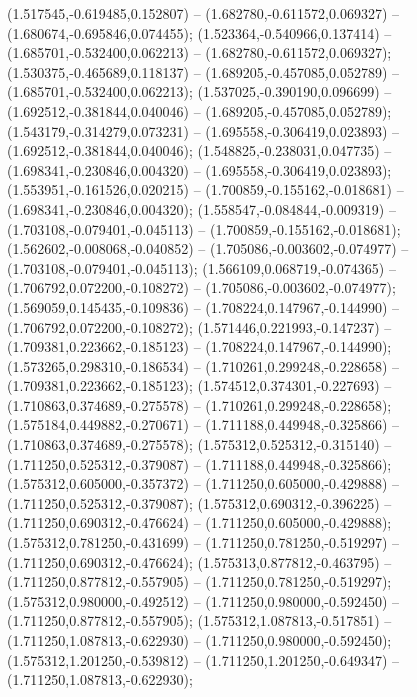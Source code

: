  (1.517545,-0.619485,0.152807) -- (1.682780,-0.611572,0.069327) -- (1.680674,-0.695846,0.074455);
 (1.523364,-0.540966,0.137414) -- (1.685701,-0.532400,0.062213) -- (1.682780,-0.611572,0.069327);
 (1.530375,-0.465689,0.118137) -- (1.689205,-0.457085,0.052789) -- (1.685701,-0.532400,0.062213);
 (1.537025,-0.390190,0.096699) -- (1.692512,-0.381844,0.040046) -- (1.689205,-0.457085,0.052789);
 (1.543179,-0.314279,0.073231) -- (1.695558,-0.306419,0.023893) -- (1.692512,-0.381844,0.040046);
 (1.548825,-0.238031,0.047735) -- (1.698341,-0.230846,0.004320) -- (1.695558,-0.306419,0.023893);
 (1.553951,-0.161526,0.020215) -- (1.700859,-0.155162,-0.018681) -- (1.698341,-0.230846,0.004320);
 (1.558547,-0.084844,-0.009319) -- (1.703108,-0.079401,-0.045113) -- (1.700859,-0.155162,-0.018681);
 (1.562602,-0.008068,-0.040852) -- (1.705086,-0.003602,-0.074977) -- (1.703108,-0.079401,-0.045113);
 (1.566109,0.068719,-0.074365) -- (1.706792,0.072200,-0.108272) -- (1.705086,-0.003602,-0.074977);
 (1.569059,0.145435,-0.109836) -- (1.708224,0.147967,-0.144990) -- (1.706792,0.072200,-0.108272);
 (1.571446,0.221993,-0.147237) -- (1.709381,0.223662,-0.185123) -- (1.708224,0.147967,-0.144990);
 (1.573265,0.298310,-0.186534) -- (1.710261,0.299248,-0.228658) -- (1.709381,0.223662,-0.185123);
 (1.574512,0.374301,-0.227693) -- (1.710863,0.374689,-0.275578) -- (1.710261,0.299248,-0.228658);
 (1.575184,0.449882,-0.270671) -- (1.711188,0.449948,-0.325866) -- (1.710863,0.374689,-0.275578);
 (1.575312,0.525312,-0.315140) -- (1.711250,0.525312,-0.379087) -- (1.711188,0.449948,-0.325866);
 (1.575312,0.605000,-0.357372) -- (1.711250,0.605000,-0.429888) -- (1.711250,0.525312,-0.379087);
 (1.575312,0.690312,-0.396225) -- (1.711250,0.690312,-0.476624) -- (1.711250,0.605000,-0.429888);
 (1.575312,0.781250,-0.431699) -- (1.711250,0.781250,-0.519297) -- (1.711250,0.690312,-0.476624);
 (1.575313,0.877812,-0.463795) -- (1.711250,0.877812,-0.557905) -- (1.711250,0.781250,-0.519297);
 (1.575312,0.980000,-0.492512) -- (1.711250,0.980000,-0.592450) -- (1.711250,0.877812,-0.557905);
 (1.575312,1.087813,-0.517851) -- (1.711250,1.087813,-0.622930) -- (1.711250,0.980000,-0.592450);
 (1.575312,1.201250,-0.539812) -- (1.711250,1.201250,-0.649347) -- (1.711250,1.087813,-0.622930);
